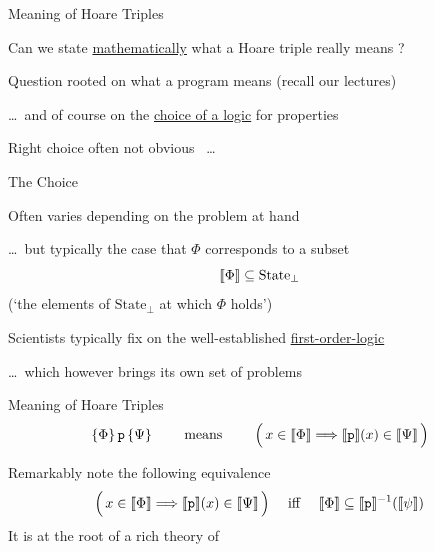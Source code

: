 \documentclass{beamer}
\begin{document}
\begin{frame}{Meaning of Hoare Triples}

        Can we state \alert{\underline{mathematically}} what a Hoare triple really means ?

        \pause
        \bigskip
        Question rooted on what a program means {\small (recall our lectures)}

        \dots \, and of course on the \alert{\underline{choice of a logic}} for properties

        \pause
        \bigskip
        Right choice often not obvious \, \dots
\end{frame}

\begin{frame}{The Choice}
        
        Often varies depending on the problem at hand

        \dots \, but typically the case that $\Phi$ corresponds to a subset
        \[
                \llbracket \Phi \rrbracket \subseteq \mathrm{State}_\bot
        \]
        {\small (`the elements of $\mathrm{State}_\bot$ at which $\Phi$ holds')}

        \pause
        \bigskip
        Scientists typically fix on the well-established \alert{\underline{first-order-logic}}

        \dots \, which however brings its own set of problems

\end{frame}

\begin{frame}{Meaning of Hoare Triples}
        \[
                \{ \Phi \} \, \mathtt{p} \, \{ \Psi \} \qquad \text{ means } \qquad 
                \Big ( \, x \in \llbracket \Phi \rrbracket \Longrightarrow \llbracket \mathtt{p} \rrbracket(x) \in \llbracket \Psi \rrbracket \, \Big )
        \]

        \pause
        \bigskip
        \bigskip
        Remarkably note the following equivalence
        \[
                \Big ( \, x \in \llbracket \Phi \rrbracket \Longrightarrow \llbracket \mathtt{p} \rrbracket(x) \in \llbracket \Psi \rrbracket \, \Big )
                \quad
                \text{ iff }
                \quad 
                \llbracket \Phi \rrbracket \subseteq \llbracket \mathtt{p} \rrbracket^{-1}(\llbracket \psi \rrbracket)
        \]
        It is at the root of a rich theory of
        \begin{center}
        \end{center}
\end{frame}
\end{document}

